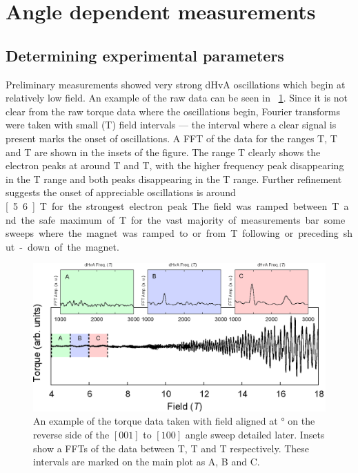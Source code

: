 
\section{Angle dependent measurements}
    \label{Sec:3:AngleDependentMeasurements}

\subsection{Determining experimental parameters}

Preliminary measurements showed very strong dHvA oscillations which begin at relatively low field.  An example of the raw data can be seen in \fig~\ref{Fig:3:RawOscillations}. Since it is not clear from the raw torque data where the oscillations begin, Fourier transforms were taken with small (\unit[1]{T}) field intervals --- the interval where a clear signal is present marks the onset of oscillations. A FFT of the data for the ranges \unit[4-5]{T}, \unit[5-6]{T} and \unit[6-7]{T} are shown in the insets of the figure. The range \unit[6-7]{T} clearly shows the electron peaks at around \unit[1500]{T} and \unit[2450]{T}, with the higher frequency peak disappearing in the \unit[5-6]{T} range and both peaks disappearing in the \unit[4-5]{T} range. Further refinement suggests the onset of appreciable oscillations is around \unit[5.6]{T} for the strongest electron peak. The field was ramped between \unit[6]{T} and the safe maximum of \unit[18]{T} for the vast majority of measurements bar some sweeps where the magnet was ramped to or from \unit[0]{T} following or preceding shut-down of the magnet.
\begin{figure}[htbp]
    \begin{center}
        \includegraphics[scale=0.7]{Chapter3-dHvABaFe2P2/Figures/AngleDepMeasurements/RawOscillations/RawOscillations}
        \caption{An example of the torque data taken with field aligned at \unit[26]{\degree} on the reverse side of the $[001]$ to $[100]$ angle sweep detailed later. Insets show a FFTs of the data between \unit[4-5]{T}, \unit[5-6]{T} and \unit[6-7]{T} respectively. These intervals are marked on the main plot as A, B and C.}
        \label{Fig:3:RawOscillations}
    \end{center}
\end{figure}

